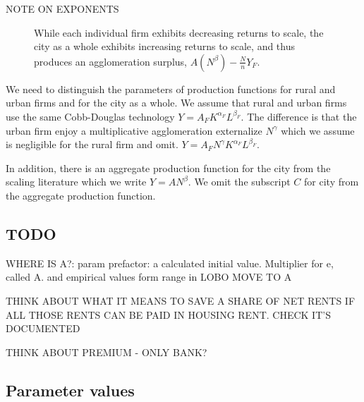 NOTE ON EXPONENTS

\begin{figure}[htb]
    \centering

    \caption{While each individual firm exhibits decreasing returns to scale, the city as a whole exhibits increasing returns to scale, and thus produces an agglomeration surplus, $A(N^\beta)-\frac{N}{n}Y_F$.}
    \label{fig:Agglomeration-surplus}
\end{figure}

We need to distinguish the parameters of production functions for rural and urban firms and for the city as a whole. We assume that  rural and  urban firms use the same Cobb-Douglas technology $Y=A_FK^{\alpha_F}L^{\beta_F}$. The difference is that the urban firm enjoy a  multiplicative agglomeration externalize $N^\gamma$ which we assume is negligible for the rural firm and omit. $Y=A_FN^\gamma  K^{\alpha_F}L^{\beta_F}$.

In addition, there is an aggregate production function for the city from the scaling literature which we write $Y=AN^\beta$. We omit the subscript $C$ for city from  the aggregate production function.    

\subsection{TODO}


WHERE IS A?: param prefactor:  a  calculated initial value. Multiplier for e, called A. and empirical values form range in LOBO MOVE TO A

THINK ABOUT WHAT IT MEANS TO SAVE A SHARE OF NET RENTS IF ALL THOSE RENTS CAN BE PAID IN HOUSING RENT. CHECK IT'S DOCUMENTED


THINK ABOUT PREMIUM - ONLY BANK?

\subsection{Parameter values}\label{sec-param-values}

